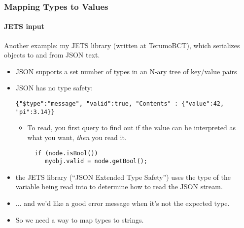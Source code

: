 \begin{frame}[fragile,t]
\frametitle{Mapping Types to Values}
\framesubtitle{JETS input}
Another example: my JETS library (written at TerumoBCT), which serializes objects to and
from JSON text.

\begin{itemize}[<+->]
\item JSON supports a set number of types in an N-ary tree of
  key/value pairs
\item JSON has no type safety:
{\scriptsize
\begin{verbatim}
{"$type":"message", "valid":true, "Contents" : {"value":42, "pi":3.14}}
\end{verbatim}
}
\begin{itemize}
  \item To read, you first query to find out if the value can be
    interpreted as what you want, \emph{then} you read it.
{\scriptsize\begin{verbatim}
  if (node.isBool())
     myobj.valid = node.getBool();
\end{verbatim}
}
\end{itemize}
\item the JETS library (``JSON Extended Type Safety'') uses the type
  of the variable being read into to determine how to read the JSON
  stream.
\item ... and we'd like a good error message when it's not the
  expected type.
\item So we need a way to map types to strings.

\end{itemize}
\end{frame}

